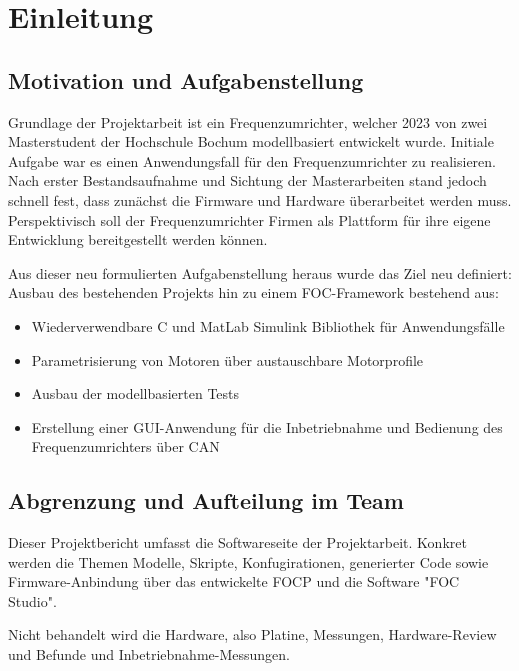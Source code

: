 \chapter{Einleitung}
\label{ch:einleitung}

\section{Motivation und Aufgabenstellung}
Grundlage der Projektarbeit ist ein Frequenzumrichter, welcher 2023 von zwei Masterstudent der Hochschule Bochum modellbasiert entwickelt wurde. Initiale Aufgabe war es einen Anwendungsfall für den Frequenzumrichter zu realisieren.
Nach erster Bestandsaufnahme und Sichtung der Masterarbeiten stand jedoch schnell fest, dass zunächst die Firmware und Hardware überarbeitet werden muss.
Perspektivisch soll der Frequenzumrichter Firmen als Plattform für ihre eigene Entwicklung bereitgestellt werden können.

Aus dieser neu formulierten Aufgabenstellung heraus wurde das Ziel neu definiert: Ausbau des bestehenden Projekts hin zu einem FOC-Framework bestehend aus:

\begin{itemize}
	\item Wiederverwendbare C und MatLab Simulink Bibliothek für Anwendungsfälle
	\item Parametrisierung von Motoren über austauschbare Motorprofile 
	\item Ausbau der modellbasierten Tests
	\item Erstellung einer \ac{GUI}-Anwendung für die Inbetriebnahme und Bedienung des Frequenzumrichters über \ac{CAN}
\end{itemize}

\section{Abgrenzung und Aufteilung im Team}
Dieser Projektbericht umfasst die Softwareseite der Projektarbeit.
Konkret werden die Themen Modelle, Skripte, Konfugirationen, generierter Code sowie Firmware-Anbindung über das entwickelte \ac{FOCP} und die Software "FOC Studio".

Nicht behandelt wird die Hardware, also Platine, Messungen, Hardware-Review und Befunde und Inbetriebnahme-Messungen.

